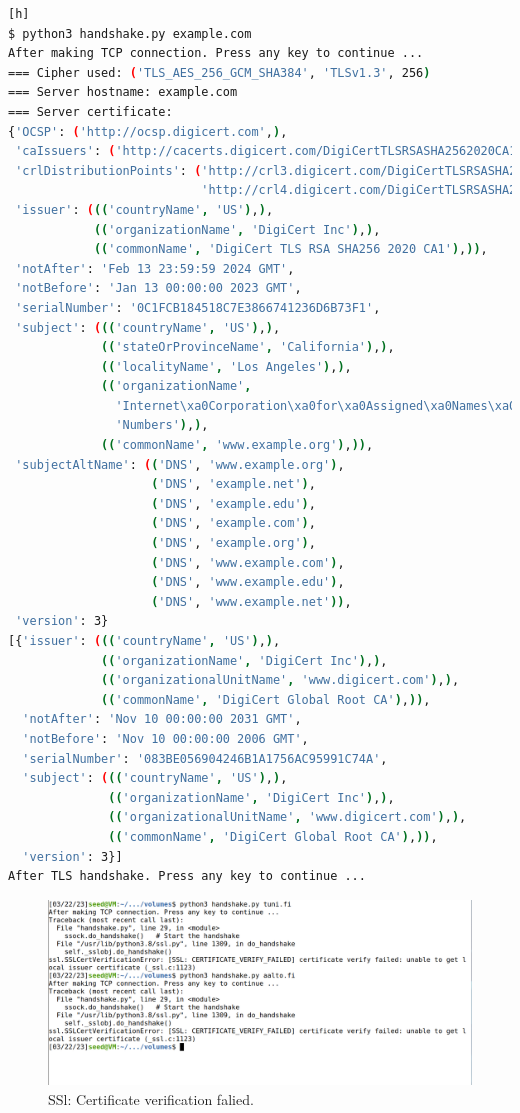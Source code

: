 \begin{lstlisting}[language=bash, caption=A successful handshake for \url{www.example.com},
    label={lst:example_handshake}][h]
$ python3 handshake.py example.com
After making TCP connection. Press any key to continue ...
=== Cipher used: ('TLS_AES_256_GCM_SHA384', 'TLSv1.3', 256)
=== Server hostname: example.com
=== Server certificate:
{'OCSP': ('http://ocsp.digicert.com',),
 'caIssuers': ('http://cacerts.digicert.com/DigiCertTLSRSASHA2562020CA1-1.crt',),
 'crlDistributionPoints': ('http://crl3.digicert.com/DigiCertTLSRSASHA2562020CA1-4.crl',
                           'http://crl4.digicert.com/DigiCertTLSRSASHA2562020CA1-4.crl'),
 'issuer': ((('countryName', 'US'),),
            (('organizationName', 'DigiCert Inc'),),
            (('commonName', 'DigiCert TLS RSA SHA256 2020 CA1'),)),
 'notAfter': 'Feb 13 23:59:59 2024 GMT',
 'notBefore': 'Jan 13 00:00:00 2023 GMT',
 'serialNumber': '0C1FCB184518C7E3866741236D6B73F1',
 'subject': ((('countryName', 'US'),),
             (('stateOrProvinceName', 'California'),),
             (('localityName', 'Los Angeles'),),
             (('organizationName',
               'Internet\xa0Corporation\xa0for\xa0Assigned\xa0Names\xa0and\xa0'
               'Numbers'),),
             (('commonName', 'www.example.org'),)),
 'subjectAltName': (('DNS', 'www.example.org'),
                    ('DNS', 'example.net'),
                    ('DNS', 'example.edu'),
                    ('DNS', 'example.com'),
                    ('DNS', 'example.org'),
                    ('DNS', 'www.example.com'),
                    ('DNS', 'www.example.edu'),
                    ('DNS', 'www.example.net')),
 'version': 3}
[{'issuer': ((('countryName', 'US'),),
             (('organizationName', 'DigiCert Inc'),),
             (('organizationalUnitName', 'www.digicert.com'),),
             (('commonName', 'DigiCert Global Root CA'),)),
  'notAfter': 'Nov 10 00:00:00 2031 GMT',
  'notBefore': 'Nov 10 00:00:00 2006 GMT',
  'serialNumber': '083BE056904246B1A1756AC95991C74A',
  'subject': ((('countryName', 'US'),),
              (('organizationName', 'DigiCert Inc'),),
              (('organizationalUnitName', 'www.digicert.com'),),
              (('commonName', 'DigiCert Global Root CA'),)),
  'version': 3}]
After TLS handshake. Press any key to continue ...
\end{lstlisting}

\begin{figure}[h!]
    \centering
    \includegraphics[height=\textheight,width=\textwidth,keepaspectratio]
    {figures/ssl_cert_verify_failed.png}
    \caption{SSl: Certificate verification falied.}
    \label{fig:cert_verify_failed}
\end{figure}

